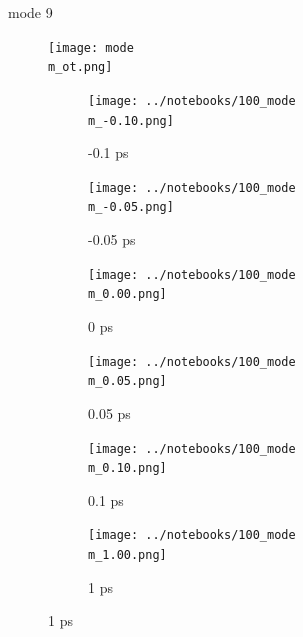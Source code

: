 \documentclass{beamer}
\newcommand\w{0.32}
\begin{document}
\renewcommand\m{9}
\begin{frame}{mode \m}
	\vspace{\vh mm}
\begin{figure}
	\centering
	\texttt{[image: mode\\m\_ot.png]}
\end{figure}
	\begin{figure}
		\centering
		\begin{subfigure}[b]{\w\textwidth}
			\centering
			\texttt{[image: ../notebooks/100\_mode\\m\_-0.10.png]}
			\caption{-0.1 ps}
		\end{subfigure}
		\begin{subfigure}[b]{\w\textwidth}
			\centering
			\texttt{[image: ../notebooks/100\_mode\\m\_-0.05.png]}
			\caption{-0.05 ps}
		\end{subfigure}
		\begin{subfigure}[b]{\w\textwidth}
			\centering
			\texttt{[image: ../notebooks/100\_mode\\m\_0.00.png]}
			\caption{0 ps}
		\end{subfigure}
		\begin{subfigure}[b]{\w\textwidth}
			\centering
			\texttt{[image: ../notebooks/100\_mode\\m\_0.05.png]}
			\caption{0.05 ps}
		\end{subfigure}
		\begin{subfigure}[b]{\w\textwidth}
			\centering
			\texttt{[image: ../notebooks/100\_mode\\m\_0.10.png]}
			\caption{0.1 ps}
		\end{subfigure}
		\begin{subfigure}[b]{\w\textwidth}
			\centering
			\texttt{[image: ../notebooks/100\_mode\\m\_1.00.png]}
			\caption{1 ps}
		\end{subfigure}
	\end{figure}
\end{frame}
\end{document}
